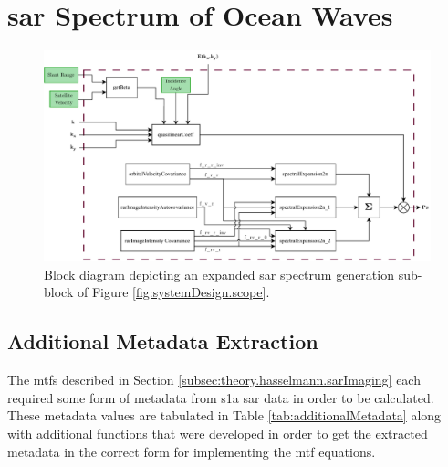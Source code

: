 \section{\acs{sar} Spectrum of Ocean Waves} \label{sec:systemDesign.sarSpectrum}

\begin{figure}[H]
    \centering
    \includegraphics[width=.95\linewidth]{Figures/PipelineDesign/sarSpectrumOverall.pdf}
    \caption{Block diagram depicting an expanded \acs{sar} spectrum generation sub-block of Figure \ref{fig:systemDesign.scope}.}
    \label{fig:systemDesign.sarSpectrum.blockDiagram}
\end{figure}




\subsection{Additional Metadata Extraction} \label{subsec:systemDesign.sarSpectrum.metadata}

The \acs{mtf}s described in Section \ref{subsec:theory.hasselmann.sarImaging} each required some form of metadata from \acs{s1a} \acs{sar} data in order to be calculated. These metadata values are tabulated in Table \ref{tab:additionalMetadata} along with additional functions that were developed in order to get the extracted metadata in the correct form for implementing the \acs{mtf} equations.

